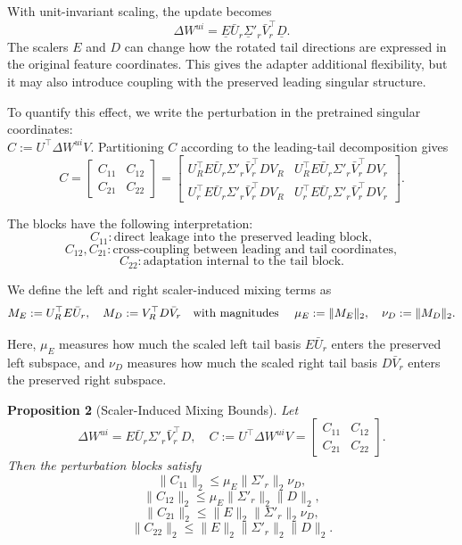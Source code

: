 With unit-invariant scaling, the update becomes
\[
\Delta W^{ui}
=
\underline E \bar{U}_r \underline \Sigma'_r \bar{V}_r^\top  \underline D .
\]
The scalers $E$ and $D$ can change how the rotated tail directions are expressed
in the original feature coordinates. This gives the adapter additional
flexibility, but it may also introduce coupling with the preserved leading
singular structure.

To quantify this effect, we write the perturbation in the pretrained singular coordinates: \\ $C := U^\top \Delta W^{ui} V$.
Partitioning $C$ according to the leading-tail decomposition gives
\[
C
=
\begin{bmatrix}
C_{11} & C_{12} \\
C_{21} & C_{22}
\end{bmatrix}
=
\begin{bmatrix}
U_R^\top E \bar{U}_r \Sigma'_r \bar{V}_r^\top D V_R
&
U_R^\top E \bar{U}_r \Sigma'_r \bar{V}_r^\top D V_r
\\[0.5em]
U_r^\top E \bar{U}_r \Sigma'_r \bar{V}_r^\top D V_R
&
U_r^\top E \bar{U}_r \Sigma'_r \bar{V}_r^\top D V_r
\end{bmatrix}.
\]

The blocks have the following interpretation:
\[
C_{11}: \text{direct leakage into the preserved leading block},
\]
\[
C_{12}, C_{21}: \text{cross-coupling between leading and tail coordinates},
\]
\[
C_{22}: \text{adaptation internal to the tail block}.
\]

We define the left and right scaler-induced mixing terms as
\[
M_E := U_R^\top E \bar{U}_r,
\quad
M_D := V_R^\top D \bar{V}_r
\text{\quad with magnitudes \quad}
\mu_E := \|M_E\|_2,
\quad
\nu_D := \|M_D\|_2 .
\]

Here, $\mu_E$ measures how much the scaled left tail basis $E\bar{U}_r$ enters
the preserved left subspace, and $\nu_D$ measures how much the scaled right tail
basis $D\bar{V}_r$ enters the preserved right subspace.

\noindent \textbf{Proposition 2} (Scaler-Induced Mixing Bounds).
\textit{
Let
\[
\Delta W^{ui}
=
E \bar{U}_r \Sigma'_r \bar{V}_r^\top D, \quad
C := U^\top \Delta W^{ui} V
=
\begin{bmatrix}
C_{11} & C_{12} \\
C_{21} & C_{22}
\end{bmatrix}.
\]
Then the perturbation blocks satisfy
}
\[
\|C_{11}\|_2
\leq
\mu_E \|\Sigma'_r\|_2 \nu_D,
\]
\[
\|C_{12}\|_2
\leq
\mu_E \|\Sigma'_r\|_2 \|D\|_2,
\]
\[
\|C_{21}\|_2
\leq
\|E\|_2 \|\Sigma'_r\|_2 \nu_D,
\]
\[
\|C_{22}\|_2
\leq
\|E\|_2 \|\Sigma'_r\|_2 \|D\|_2.
\]


